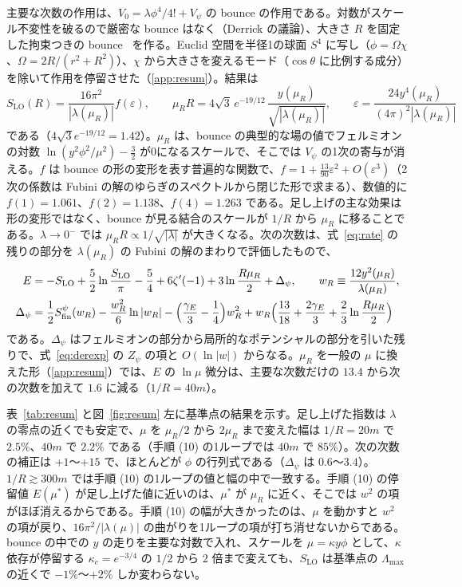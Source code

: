 \documentclass[a4paper,10pt]{ltjsarticle}
\begin{document}
主要な次数の作用は、$V_0=\lambda\phi^4/4!+V_\psi$ の bounce の作用である。対数がスケール不変性を破るので厳密な bounce はなく（Derrick の議論）、大きさ $R$ を固定した拘束つきの bounce~\cite{affleck} を作る。Euclid 空間を半径1の球面 $S^4$ に写し（$\phi=\Omega\chi$、$\Omega=2R/(r^2+R^2)$）、$\chi$ から大きさを変えるモード（$\cos\theta$ に比例する成分）を除いて作用を停留させた（\ref{app:resum}）。結果は
\begin{equation}
S_{\mathrm{LO}}(R)=\frac{16\pi^2}{|\lambda(\mu_R)|}f(\varepsilon),\qquad
\mu_RR=4\sqrt3\,e^{-19/12}\,\frac{y(\mu_R)}{\sqrt{|\lambda(\mu_R)|}},\qquad
\varepsilon=\frac{24y^4(\mu_R)}{(4\pi)^2|\lambda(\mu_R)|}
\label{eq:lo}
\end{equation}
である（$4\sqrt3e^{-19/12}=1.42$）。$\mu_R$ は、bounce の典型的な場の値でフェルミオンの対数 $\ln(y^2\phi^2/\mu^2)-\frac32$ が0になるスケールで、そこでは $V_\psi$ の1次の寄与が消える。$f$ は bounce の形の変形を表す普遍的な関数で、$f=1+\frac{13}{90}\varepsilon^2+O(\varepsilon^3)$（2次の係数は Fubini の解のゆらぎのスペクトルから閉じた形で求まる）、数値的に $f(1)=1.061$、$f(2)=1.138$、$f(4)=1.263$ である。足し上げの主な効果は形の変形ではなく、bounce が見る結合のスケールが $1/R$ から $\mu_R$ に移ることである。$\lambda\to0^-$ では $\mu_RR\propto1/\sqrt{|\lambda|}$ が大きくなる。次の次数は、式~\eqref{eq:rate} の残りの部分を $\lambda(\mu_R)$ の Fubini の解のまわりで評価したもので、
\begin{equation}
\begin{aligned}
E&=-S_{\mathrm{LO}}+\frac52\ln\frac{S_{\mathrm{LO}}}{\pi}-\frac54+6\zeta'(-1)+3\ln\frac{R\mu_R}{2}+\Delta_\psi,\qquad w_R\equiv\frac{12y^2(\mu_R)}{\lambda(\mu_R)},\\
\Delta_\psi&=\frac12S^\psi_{\mathrm{fin}}(w_R)-\frac{w_R^2}{6}\ln|w_R|-\Bigl(\frac{\gamma_E}{3}-\frac14\Bigr)w_R^2+w_R\Bigl(\frac{13}{18}+\frac{2\gamma_E}{3}+\frac23\ln\frac{R\mu_R}{2}\Bigr)
\end{aligned}
\label{eq:nlo}
\end{equation}
である。$\Delta_\psi$ はフェルミオンの部分から局所的なポテンシャルの部分を引いた残りで、式~\eqref{eq:derexp} の $Z_\psi$ の項と $O(\ln|w|)$ からなる。$\mu_R$ を一般の $\mu$ に換えた形（\ref{app:resum}）では、$E$ の $\ln\mu$ 微分は、主要な次数だけの $13.4$ から次の次数を加えて $1.6$ に減る（$1/R=40m$）。

表~\ref{tab:resum} と図~\ref{fig:resum} 左に基準点の結果を示す。足し上げた指数は $\lambda$ の零点の近くでも安定で、$\mu$ を $\mu_R/2$ から $2\mu_R$ まで変えた幅は $1/R=20m$ で $2.5\%$、$40m$ で $2.2\%$ である（手順 (10) の1ループでは $40m$ で $85\%$）。次の次数の補正は $+1$〜$+15$ で、ほとんどが $\phi$ の行列式である（$\Delta_\psi$ は $0.6$〜$3.4$）。$1/R\gtrsim300m$ では手順 (10) の1ループの値と幅の中で一致する。手順 (10) の停留値 $E(\mu^*)$ が足し上げた値に近いのは、$\mu^*$ が $\mu_R$ に近く、そこでは $w^2$ の項がほぼ消えるからである。手順 (10) の幅が大きかったのは、$\mu$ を動かすと $w^2$ の項が戻り、$16\pi^2/|\lambda(\mu)|$ の曲がりを1ループの項が打ち消せないからである。bounce の中での $y$ の走りを主要な対数で入れ、スケールを $\mu=\kappa y\phi$ として、$\kappa$ 依存が停留する $\kappa_c=e^{-3/4}$ の $1/2$ から $2$ 倍まで変えても、$S_{\mathrm{LO}}$ は基準点の $\Lambda_{\max}$ の近くで $-1\%$〜$+2\%$ しか変わらない。
\end{document}
